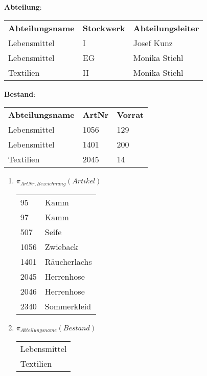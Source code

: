 \documentclass{lehramt-informatik-haupt}
\newcommand{\tmptabelle}[1]{
\bigskip
\par
\noindent
\textbf{#1}:
\bigskip
\par
\noindent
}
\begin{document}
\begin{enumerate}
\tmptabelle{Abteilung}

\begin{tabular}{lll}
\textbf{Abteilungsname} & \textbf{Stockwerk} & \textbf{Abteilungsleiter} \\
Lebensmittel   & I         & Josef Kunz       \\
Lebensmittel   & EG        & Monika Stiehl    \\
Textilien      & II        & Monika Stiehl
\end{tabular}

\tmptabelle{Bestand}

\begin{tabular}{lll}
\textbf{Abteilungsname}  & \textbf{ArtNr} & \textbf{Vorrat} \\
Lebensmittel    & 1056  & 129    \\
Lebensmittel    & 1401  & 200    \\
Textilien       & 2045  & 14
\end{tabular}

\begin{enumerate}


\item $\pi_{ArtNr,Bezeichnung}(Artikel)$

\begin{antwort}[muster]
\begin{tabular}{ll}
95    & Kamm          \\
97    & Kamm          \\
507   & Seife         \\
1056  & Zwieback      \\
1401  & Räucherlachs  \\
2045  & Herrenhose    \\
2046  & Herrenhose    \\
2340  & Sommerkleid
\end{tabular}
\end{antwort}


\item $\pi_{Abteilungsname}(Bestand)$

\begin{antwort}[muster]
\begin{tabular}{l}
Lebensmittel   \\
Textilien
\end{tabular}
\end{antwort}



\end{enumerate}
\end{enumerate}
\end{document}
